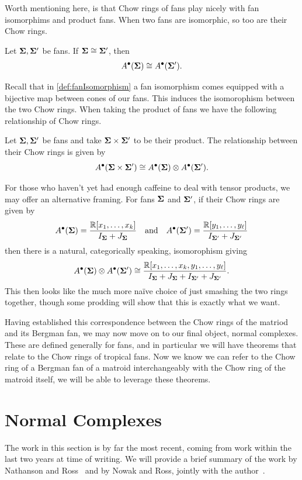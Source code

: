 \documentclass[12pt,oneside]{../../sfsuthesis}
\begin{document}
Worth mentioning here, is that Chow rings of fans play nicely with fan isomorphims and product fans.
When two fans are isomorphic, so too are their Chow rings.
\begin{proposition}
    Let \( {\bm{\Sigma}}, {\bm{\Sigma}}' \) be fans. If  \( {\bm{\Sigma}} \cong {\bm{\Sigma}}' \), then
    \[
        A^\bullet({\bm{\Sigma}}) \cong A^\bullet({\bm{\Sigma}}').
    \]
\end{proposition}
Recall that in \th\ref{def:fanIsomorphism} a fan isomorphism comes equipped with a bijective map between cones of our fans.
This induces the isomorophism between the two Chow rings.
When taking the product of fans we have the following relationship of Chow rings.
\begin{proposition}
    Let \( {\bm{\Sigma}}, {\bm{\Sigma}}' \) be fans and take \( {\bm{\Sigma}} \times {\bm{\Sigma}}' \) to be their product.
    The relationship between their Chow rings is given by
    \[
        A^\bullet({\bm{\Sigma}} \times {\bm{\Sigma}}') \cong A^\bullet({\bm{\Sigma}}) \otimes A^\bullet({\bm{\Sigma}}').
    \]
\end{proposition}
For those who haven't yet had enough caffeine to deal with tensor products, we may offer an alternative framing.
For fans \( {\bm{\Sigma}} \) and \( {\bm{\Sigma}}' \), if their Chow rings are given by
\[
    A^\bullet({\bm{\Sigma}}) = \frac{\mathbb{R}[x_1, \dots, x_k]}{I_{{\bm{\Sigma}}} + J_{{\bm{\Sigma}}}}
    \quad \text{and} \quad
    A^\bullet({\bm{\Sigma}}') = \frac{\mathbb{R}[y_1, \dots, y_\ell]}{I_{{\bm{\Sigma}}'} + J_{{\bm{\Sigma}}'}}
\]
then there is a natural, categorically speaking, isomorophism giving
\[
    A^\bullet({\bm{\Sigma}}) \otimes A^\bullet({\bm{\Sigma}}') \cong
    \frac{\mathbb{R}[x_1, \dots, x_k, y_1, \dots, y_\ell]}{I_{{\bm{\Sigma}}} + J_{{\bm{\Sigma}}} + I_{{\bm{\Sigma}}'} + J_{{\bm{\Sigma}}'}}.
\]
This then looks like the much more na\"ive choice of just smashing the two rings together, though some prodding will show that this is exactly what we want.

Having established this correspondence between the Chow rings of the matriod and its Bergman fan, we may now move on to our final object, normal complexes.
These are defined generally for fans, and in particular we will have theorems that relate to the Chow rings of tropical fans.
Now we know we can refer to the Chow ring of a Bergman fan of a matroid interchangeably with the Chow ring of the matroid itself, we will be able to leverage these theorems.


\section{Normal Complexes}
The work in this section is by far the most recent, coming from work within the last two years at time of writing.
We will provide a brief summary of the work by Nathanson and Ross~\cite{nathansonTropicalFansNormal2023} and by Nowak and Ross, jointly with the author~\cite{nowakMixedVolumesNormal2023}.
\end{document}
